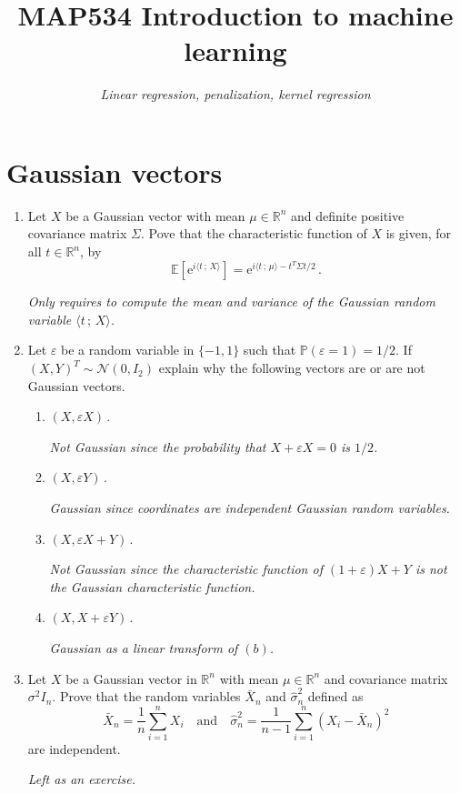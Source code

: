\documentclass[a4paper,10pt,fleqn]{article}
\title{{\bf MAP534 Introduction to machine learning}}
\author{{\em Linear regression, penalization, kernel regression}}
\date{}
\newcommand{\eqsp}{\,}
\newcommand{\rset}{\ensuremath{\mathbb{R}}}
\newcommand{\bP}{\mathbb{P}}
\newcommand{\rme}{\ensuremath{\mathrm{e}}}
\newcommand{\1}{\ensuremath{\mathbbm{1}}}
\newcommand{\bE}{\mathbb{E}}
\begin{document}
\maketitle




\section*{Gaussian vectors}
\begin{enumerate}
\item Let $X$ be a Gaussian vector with mean $\mu\in\rset^n$ and definite positive covariance matrix $\Sigma$. Pove that the characteristic function of $X$ is given, for all $t\in\rset^n$, by
$$
\bE[\rme^{i\langle t\eqsp;\eqsp X\rangle}] = \rme^{i\langle t\eqsp;\eqsp \mu\rangle - t^T\Sigma t /2}\eqsp.
$$

\vspace{.2cm}

{\em
Only requires to compute the mean and variance of the Gaussian random variable $\langle t\eqsp;\eqsp X\rangle$. 
}


\item Let $\varepsilon$ be a random variable in $\{-1,1\}$ such that $\bP(\varepsilon = 1) = 1/2$. If $(X,Y)^T\sim \mathcal{N}(0,I_2)$ explain why the following vectors are or are not Gaussian vectors.
\begin{enumerate}
\item $(X,\varepsilon X)$\eqsp.

{\em
Not Gaussian since the probability that  $X +\varepsilon X = 0$ is $1/2$.
}

\item $(X,\varepsilon Y)$\eqsp.

{\em
Gaussian since coordinates are independent Gaussian random variables.
}

\item $(X,\varepsilon X + Y)$\eqsp.

{\em
Not Gaussian since the characteristic function of $(1+\varepsilon) X + Y$ is not the Gaussian characteristic function.
}

\item $(X,X + \varepsilon Y)$\eqsp.

{\em
Gaussian as a linear transform of $(b)$.
}

\end{enumerate}

\item Let $X$ be a Gaussian vector in $\rset^n$ with mean $\mu\in\rset^n$ and covariance matrix $\sigma^2 I_n$. Prove that the random variables $\bar X_n$ and $\widehat \sigma^2_n$ defined as
$$
\bar X_n = \frac{1}{n}\sum_{i=1}^n X_i\quad \mathrm{and} \quad \widehat \sigma^2_n = \frac{1}{n-1}\sum_{i=1}^n (X_i - \bar X_n)^2
$$
are independent.

\vspace{.2cm}

{\em
Left as an exercise.
}
\end{enumerate}
\end{document}
